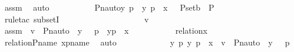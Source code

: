 \begin{isabellebody}
\ assm\ \isamarkupfalse%
\ auto\isanewline
\ \ \ \ \ \ \isamarkupfalse%
\ \isamarkupfalse%
\ {\isachardoublequoteopen}{\isacharbraceleft}{\kern0pt}\ {\isacharless}{\kern0pt}Pn{\isacharunderscore}{\kern0pt}auto{\isacharparenleft}{\kern0pt}{\isasympi}{\isacharparenright}{\kern0pt}{\isacharbackquote}{\kern0pt}y{\isacharcomma}{\kern0pt}\ {\isasympi}{\isacharbackquote}{\kern0pt}p{\isachargreater}{\kern0pt}\ {\isachardot}{\kern0pt}\ {\isacharless}{\kern0pt}y{\isacharcomma}{\kern0pt}\ p{\isachargreater}{\kern0pt}\ {\isasymin}\ x\ {\isacharbraceright}{\kern0pt}\ {\isasymsubseteq}\ P{\isacharunderscore}{\kern0pt}set{\isacharparenleft}{\kern0pt}b{\isacharparenright}{\kern0pt}\ {\isasymtimes}\ P{\isachardoublequoteclose}\ \isanewline
\ \ \ \ \ \ \ \ \isamarkupfalse%
\ {\isacharparenleft}{\kern0pt}rule{\isacharunderscore}{\kern0pt}tac\ subsetI{\isacharparenright}{\kern0pt}\ \isanewline
\ \ \ \ \ \ \isamarkupfalse%
\ {\isacharminus}{\kern0pt}\ \isanewline
\ \ \ \ \ \ \ \ \isamarkupfalse%
\ v\isanewline
\ \ \ \ \ \ \ \ \isamarkupfalse%
\ assm{}\ {\isacharcolon}{\kern0pt}\ {\isachardoublequoteopen}v\ {\isasymin}\ {\isacharbraceleft}{\kern0pt}{\isasymlangle}Pn{\isacharunderscore}{\kern0pt}auto{\isacharparenleft}{\kern0pt}{\isasympi}{\isacharparenright}{\kern0pt}\ {\isacharbackquote}{\kern0pt}\ y{\isacharcomma}{\kern0pt}\ {\isasympi}\ {\isacharbackquote}{\kern0pt}\ p{\isasymrangle}\ {\isachardot}{\kern0pt}\ {\isasymlangle}y{\isacharcomma}{\kern0pt}p{\isasymrangle}\ {\isasymin}\ x{\isacharbraceright}{\kern0pt}{\isachardoublequoteclose}\ \isanewline
\ \ \ \ \ \ \ \ \isamarkupfalse%
\ {\isachardoublequoteopen}relation{\isacharparenleft}{\kern0pt}x{\isacharparenright}{\kern0pt}{\isachardoublequoteclose}\ \isamarkupfalse%
\ relation{\isacharunderscore}{\kern0pt}P{\isacharunderscore}{\kern0pt}name\ xpname\ \isamarkupfalse%
\ auto\ \isanewline
\ \ \ \ \ \ \ \ \isamarkupfalse%
\ \isamarkupfalse%
\ {\isachardoublequoteopen}{\isasymexists}y\ p{\isachardot}{\kern0pt}\ {\isasymlangle}y{\isacharcomma}{\kern0pt}\ p{\isasymrangle}\ {\isasymin}\ x\ {\isasymand}\ v\ {\isacharequal}{\kern0pt}\ {\isasymlangle}Pn{\isacharunderscore}{\kern0pt}auto{\isacharparenleft}{\kern0pt}{\isasympi}{\isacharparenright}{\kern0pt}\ {\isacharbackquote}{\kern0pt}\ y{\isacharcomma}{\kern0pt}\ {\isasympi}\ {\isacharbackquote}{\kern0pt}\ p{\isasymrangle}{\isachardoublequoteclose}\ \isanewline
\ \ \ \ \ \ \ \ \ \ \isamarkupfalse%

\end{isabellebody}
